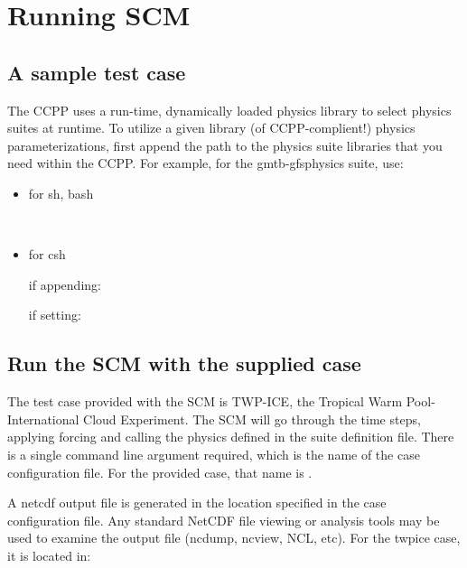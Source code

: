 \chapter{Running SCM}
\label{chapter: runningscm}
\setlength{\parskip}{12pt}
\label{section: runningscm}

\section{A sample test case}

The CCPP uses a run-time, dynamically loaded physics library to select physics suites at runtime.  To utilize a given library (of CCPP-complient!) physics parameterizations, first append the path to the physics suite libraries that you need
within the CCPP. For example, for the gmtb-gfsphysics suite, use:
\begin{itemize}
	\item for sh, bash

     \\

	\item for csh

     if appending: \\

     if setting: \\
\end{itemize}


\section{Run the SCM with the supplied case} 
The test case provided with the SCM is TWP-ICE, the Tropical Warm Pool-International Cloud Experiment. The SCM will go through the time steps, applying forcing and calling the physics defined in the suite definition file.
There is a single command line argument required, which is the name of the case configuration file.  For the provided case, that name is .


A netcdf output file is generated in the location specified in the case
configuration file. Any standard NetCDF file viewing or analysis tools may be used to 
examine the output file (ncdump, ncview, NCL, etc).  For the twpice case, it is located in:


